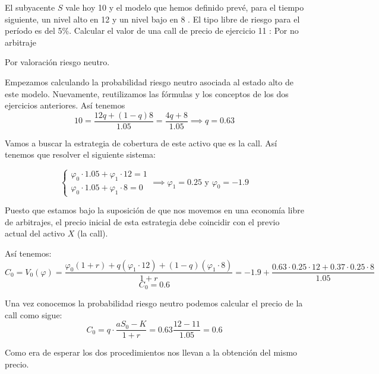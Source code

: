 \begin{problem}[3]
El subyacente $S$ vale hoy 10 \texteuro y el modelo que hemos definido prevé, para el tiempo siguiente, un nivel alto en 12 \texteuro y un nivel bajo en 8 \texteuro. El tipo libre de riesgo para el período es del 5\%. Calcular el valor de una call de precio de ejercicio 11 \texteuro:
\ppart Por no arbitraje

\ppart Por valoración riesgo neutro.
\solution

Empezamos calculando la probabilidad riesgo neutro asociada al estado alto de este modelo. Nuevamente, reutilizamos las fórmulas y los conceptos de los dos ejercicios anteriores. Así tenemos
\[10 = \frac{12q + (1-q)8}{1.05} = \frac{4q+8}{1.05} \implies q=0.63\]

\spart

Vamos a buscar la estrategia de cobertura de este activo que es la call. Así tenemos que resolver el siguiente sistema:

\[\left\{ \begin{array}{l}
\varphi_0 \cdot 1.05 + \varphi_1\cdot 12 = 1 \\
\varphi_0 \cdot 1.05 + \varphi_1\cdot 8 = 0
\end{array}\right. \implies \varphi_1 = 0.25 \text{ y } \varphi_0 = -1.9\]

Puesto que estamos bajo la suposición de que nos movemos en una economía libre de arbitrajes, el precio inicial de esta estrategia debe coincidir con el previo actual del activo $X$ (la call).

Así tenemos:
\[C_0 = V_0(\varphi) = \frac{\varphi_0(1+r) + q(\varphi_1 \cdot 12) + (1-q)(\varphi_1\cdot 8)}{1+r} = -1.9 + \frac{0.63 \cdot 0.25\cdot 12 + 0.37 \cdot 0.25 \cdot 8}{1.05}\]
\[C_0 = 0.6\]
\spart

Una vez conocemos la probabilidad riesgo neutro podemos calcular el precio de la call como sigue:
\[C_0 = q\cdot \frac{aS_0 - K}{1+r} = 0.63 \frac{12-11}{1.05} = 0.6\]

Como era de esperar los dos procedimientos nos llevan a la obtención del mismo precio.
\end{problem}

